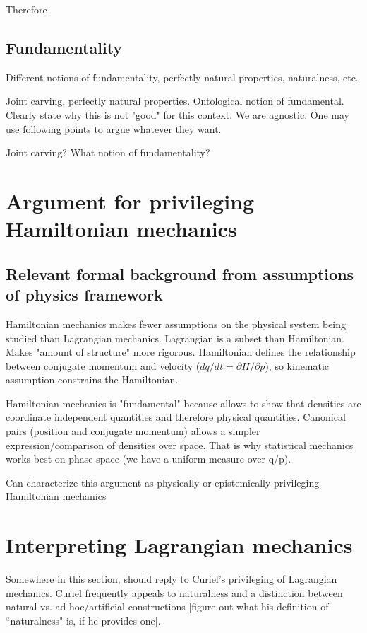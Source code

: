 \documentclass[letterpaper]{article}
\begin{document}
Therefore

\subsection{Fundamentality}

Different notions of fundamentality, perfectly natural properties, naturalness, etc. 

Joint carving, perfectly natural properties. Ontological notion of fundamental. Clearly state why this is not "good" for this context. We are agnostic. One may use following points to argue whatever they want.

Joint carving? What notion of fundamentality? 

\section{Argument for privileging Hamiltonian mechanics}

\subsection{Relevant formal background from assumptions of physics framework}

Hamiltonian mechanics makes fewer assumptions on the physical system being studied than Lagrangian mechanics. Lagrangian is a subset than Hamiltonian. Makes "amount of structure" more rigorous. Hamiltonian defines the relationship between conjugate momentum and velocity ($dq/dt = \partial H / \partial p$), so kinematic assumption constrains the Hamiltonian.

Hamiltonian mechanics is "fundamental" because allows to show that densities are coordinate independent quantities and therefore physical quantities. Canonical pairs (position and conjugate momentum) allows a simpler expression/comparison of densities over space. That is why statistical mechanics works best on phase space (we have a uniform measure over q/p).

Can characterize this argument as physically or epistemically privileging Hamiltonian mechanics 

\section{Interpreting Lagrangian mechanics}

Somewhere in this section, should reply to Curiel's privileging of Lagrangian mechanics. Curiel frequently appeals to naturalness and a distinction between natural vs. ad hoc/artificial constructions [figure out what his definition of ``naturalness" is, if he provides one].
\end{document}
